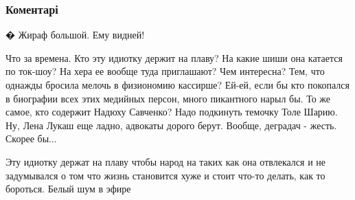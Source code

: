  
 
 
 
 
\subsubsection{Коментарі}
\label{sec:05_08_2021.fb.peseckij_valerij.1.nicoj_mova_jazyk.cmt}

\begin{itemize}
 
� Жираф большой. Ему видней!

 

Что за времена. Кто эту идиотку держит на плаву? На какие шиши она катается по
ток-шоу? На хера ее вообще туда приглашают? Чем интересна? Тем, что однажды
бросила мелочь в физиономию кассирше? Ей-ей, если бы кто покопался в биографии
всех этих медийных персон, много пикантного нарыл бы. То же самое, кто содержит
Надюху Савченко? Надо подкинуть темочку Толе Шарию. Ну, Лена Лукаш еще ладно,
адвокаты дорого берут. Вообще, деградач - жесть. Скорее бы...

\begin{itemize}
 

Эту идиотку держат на плаву чтобы народ на таких как она отвлекался и не
задумывался о том что жизнь становится хуже и стоит что-то делать, как то
бороться. Белый шум в эфире


 

\end{itemize}
\end{itemize}
